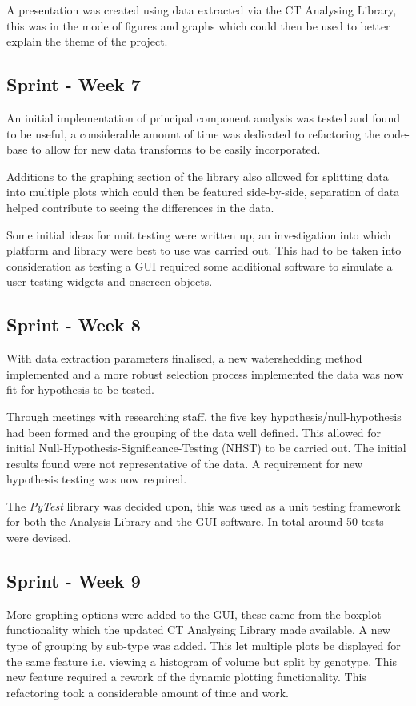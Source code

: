 \documentclass[11pt]{report}
\begin{document}
A presentation was created using data extracted via the CT Analysing Library, this was in the mode of figures and graphs which could then be used to better explain the theme of the project.

\subsection{Sprint - Week 7}
\label{sec:org733e002}
An initial implementation of principal component analysis was tested and found to be useful, a considerable amount of time was dedicated to refactoring the code-base to allow for new data transforms to be easily incorporated.

Additions to the graphing section of the library also allowed for splitting data into multiple plots which could then be featured side-by-side, separation of data helped contribute to seeing the differences in the data.

Some initial ideas for unit testing were written up, an investigation into which platform and library were best to use was carried out. This had to be taken into consideration as testing a GUI required some additional software to simulate a user testing widgets and onscreen objects.

\subsection{Sprint - Week 8}
\label{sec:org088eec0}
With data extraction parameters finalised, a new watershedding method implemented and a more robust selection process implemented the data was now fit for hypothesis to be tested.

Through meetings with researching staff, the five key hypothesis/null-hypothesis had been formed and the grouping of the data well defined. This allowed for initial Null-Hypothesis-Significance-Testing (NHST) to be carried out. The initial results found were not representative of the data. A requirement for new hypothesis testing was now required.

The \emph{PyTest} library was decided upon, this was used as a unit testing framework for both the Analysis Library and the GUI software. In total around 50 tests were devised.

\subsection{Sprint - Week 9}
\label{sec:org20a4bf1}
More graphing options were added to the GUI, these came from the boxplot functionality which the updated CT Analysing Library made available. A new type of grouping by sub-type was added. This let multiple plots be displayed for the same feature i.e. viewing a histogram of volume but split by genotype. This new feature required a rework of the dynamic plotting functionality. This refactoring took a considerable amount of time and work.
\end{document}
